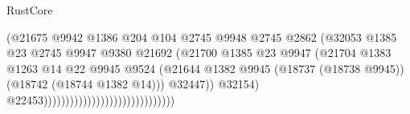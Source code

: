 \begin{lexlean}{RustCore}
\begin{coremodule}
                                                              (@21675
                                                                @9942
                                                                @1386
                                                                @204
                                                                @104
                                                                @2745
                                                                @9948
                                                                @2745
                                                                @2862
                                                                (@32053
                                                                  @1385
                                                                  @23
                                                                  @2745
                                                                  @9947
                                                                  @9380
                                                                  @21692
                                                                  (@21700
                                                                    @1385
                                                                    @23
                                                                    @9947
                                                                    (@21704
                                                                      @1383
                                                                      @1263
                                                                      @14
                                                                      @22
                                                                      @9945
                                                                      @9524
                                                                      (@21644
                                                                        @1382
                                                                        @9945
                                                                        (@18737 (@18738 @9945))
                                                                        (@18742 (@18744 @1382 @14)))
                                                                      @32447))
                                                                  @32154)
                                                                @22453))))))))))))))))))))))))))))))

\end{coremodule}
\end{lexlean}
